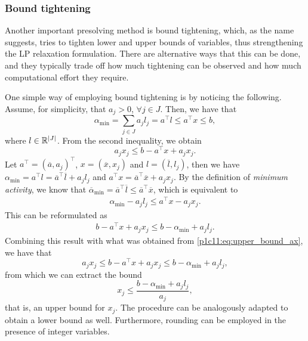 \subsubsection{Bound tightening}

Another important presolving method is bound tightening, which, as the name suggests, tries to tighten lower and upper bounds of variables, thus strengthening the LP relaxation formulation. There are alternative ways that this can be done, and they typically trade off how much tightening can be observed and how much computational effort they require. 

One simple way of employing bound tightening is by noticing the following. Assume, for simplicity, that $a_j > 0$, $\forall j \in J$. Then, we have that
%
\begin{equation*}
	\alpha_{\text{min}} = \sum_{j \in J}a_jl_j = a^\top l \le a^\top x \le b,
\end{equation*}
%
where $l \in \mathbb{R}^{|J|}$. From the second inequality, we obtain 
%
\begin{equation} \label{p1c11:eq:upper_bound_ax}
    a_jx_j \le b - a^\top x + a_jx_j.	
\end{equation}
%
Let $a^\top = (\overline{a}, a_j)^\top$, $x = (\overline{x}, x_j)$ and $l = (\overline{l}, l_j)$, then we have $\alpha_{\text{min}} = a^\top l = \overline{a}^\top \overline{l} + a_j l_j$ and $a^\top x = \overline{a}^\top \overline{x} + a_j x_j$. By the definition of \emph{minimum activity}, we know that $\overline{\alpha}_{\text{min}} = \overline{a}^\top \overline{l} \le \overline{a}^\top \overline{x}$, which is equivalent to 
%
\begin{align*}
    \alpha_{\text{min}} - a_jl_j \le a^\top x - a_jx_j.
\end{align*}
%
This can be reformulated as 
%
\begin{align*}
    b - a^\top x + a_jx_j \le b - \alpha_{\text{min}} + a_jl_j.
\end{align*}
%
Combining this result with what was obtained from \eqref{p1c11:eq:upper_bound_ax}, we have that
\begin{equation*}
	 a_jx_j \le b - a^\top x + a_jx_j \le b - \alpha_{\text{min}} + a_jl_j,
\end{equation*}
%
from which we can extract the bound
%
\begin{equation*}
	x_j \leq \frac{b - \alpha_{\text{min}} + a_jl_j}{a_j},
\end{equation*}
%
that is, an upper bound for $x_j$. The procedure can be analogously adapted to obtain a lower bound as well. Furthermore, rounding can be employed in the presence of integer variables. 

